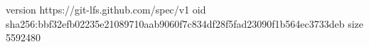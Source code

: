 version https://git-lfs.github.com/spec/v1
oid sha256:bbf32efb02235e21089710aab9060f7c834df28f5fad23090f1b564ec3733deb
size 5592480

